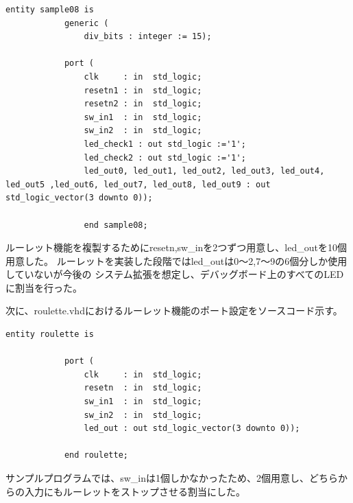 \documentclass{ltjsarticle}
\begin{document}
			\begin{lstlisting}[caption = Sample08のポート設定, label = code:Sample08port]
			entity sample08 is
			generic (
				div_bits : integer := 15);
			
			port (
				clk     : in  std_logic;
				resetn1 : in  std_logic;
				resetn2 : in  std_logic;
				sw_in1  : in  std_logic;
				sw_in2  : in  std_logic;
				led_check1 : out std_logic :='1';
				led_check2 : out std_logic :='1';
				led_out0, led_out1, led_out2, led_out3, led_out4, led_out5 ,led_out6, led_out7, led_out8, led_out9 : out std_logic_vector(3 downto 0));

				end sample08;
			\end{lstlisting}

			ルーレット機能を複製するためにresetn,sw\_inを2つずつ用意し、led\_outを10個用意した。
			ルーレットを実装した段階ではled\_outは0〜2,7〜9の6個分しか使用していないが今後の
			システム拡張を想定し、デバッグボード上のすべてのLEDに割当を行った。

			次に、roulette.vhdにおけるルーレット機能のポート設定をソースコード示す。
			\begin{lstlisting}[caption = roulette.vhd::ルーレット機能のポート設定, label = code:roulettePort]
			entity roulette is
			
			port (
				clk     : in  std_logic;
				resetn  : in  std_logic;
				sw_in1  : in  std_logic;
				sw_in2  : in  std_logic;
				led_out : out std_logic_vector(3 downto 0));

			end roulette;
			\end{lstlisting}
			サンプルプログラムでは、sw\_inは1個しかなかったため、2個用意し、どちらからの入力にもルーレットをストップさせる割当にした。
\end{document}
